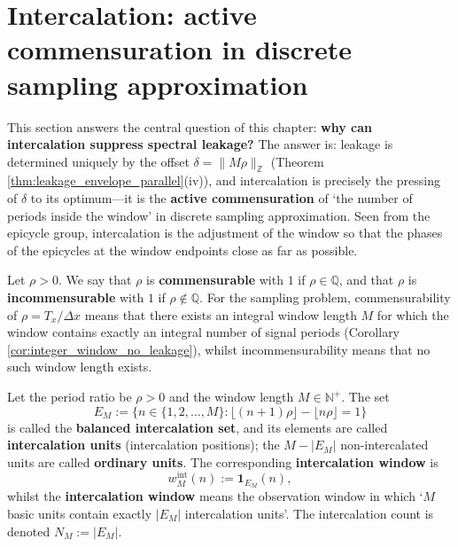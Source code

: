 \section{Intercalation: active commensuration in discrete sampling approximation}\label{sec:commensurability_intercalation}

This section answers the central question of this chapter: \textbf{why can intercalation suppress spectral leakage?} The answer is: leakage is determined uniquely by the offset $\delta=\|M\rho\|_{\mathbb{Z}}$ (Theorem \ref{thm:leakage_envelope_parallel}(iv)), and intercalation is precisely the pressing of $\delta$ to its optimum---it is the \textbf{active commensuration} of `the number of periods inside the window' in discrete sampling approximation. Seen from the epicycle group, intercalation is the adjustment of the window so that the phases of the epicycles at the window endpoints close as far as possible.

\begin{definition}[Commensurability]\label{def:commensurability_parallel}
Let $\rho>0$. We say that $\rho$ is \textbf{commensurable} with $1$ if $\rho\in\mathbb{Q}$, and that $\rho$ is \textbf{incommensurable} with $1$ if $\rho\notin\mathbb{Q}$. For the sampling problem, commensurability of $\rho=T_x/\Delta x$ means that there exists an integral window length $M$ for which the window contains exactly an integral number of signal periods (Corollary \ref{cor:integer_window_no_leakage}), whilst incommensurability means that no such window length exists.
\end{definition}

\begin{definition}\label{def:intercalation_sequence_parallel}
Let the period ratio be $\rho>0$ and the window length $M\in\mathbb{N}^+$. The set
\[
E_M:=\big\{n\in\{1,2,\dots,M\}:\lfloor(n+1)\rho\rfloor-\lfloor n\rho\rfloor=1\big\}
\]
is called the \textbf{balanced intercalation set}, and its elements are called \textbf{intercalation units} (intercalation positions); the $M-|E_M|$ non-intercalated units are called \textbf{ordinary units}. The corresponding \textbf{intercalation window} is
\[
w^{\mathrm{int}}_M(n):=\mathbf{1}_{E_M}(n),
\]
whilst the \textbf{intercalation window} means the observation window in which `$M$ basic units contain exactly $|E_M|$ intercalation units'. The intercalation count is denoted $N_M:=|E_M|$.
\end{definition}

